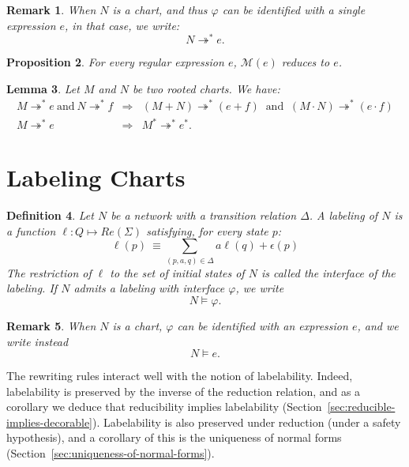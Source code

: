 \documentclass{article}
\newtheorem{definition}{Definition}[section]
\newtheorem{lemma}[definition]{Lemma}
\newtheorem{proposition}[definition]{Proposition}
\newtheorem{remark}[definition]{Remark}
\newcommand{\milner}[1]{\mathcal{M}(#1)}
\begin{document}
\begin{remark}
  When $N$ is a chart, and thus $\varphi$ can be identified with a single expression $e$, in that case, we write:
  \[N \twoheadrightarrow^* e.\] 
  \end{remark}


\begin{proposition} For every regular expression $e$, $\milner{e}$ reduces to $e$.
    ~\label{prop:Milner-is-reducible}
\end{proposition}


\begin{lemma} Let $M$ and $N$ be two rooted charts. We have:
  $$\begin{array}{rcl}
    M\twoheadrightarrow^* e\ \text{and}\ N\twoheadrightarrow^* f & \Longrightarrow&  (M+N) \twoheadrightarrow^* (e+f)\ \text{ and }\ (M \cdot N) \twoheadrightarrow^* (e \cdot f)\\[6pt]
  M \twoheadrightarrow^* e & \Longrightarrow&  M^* \twoheadrightarrow^* e^*.
  \end{array}$$
\end{lemma}

\section{Labeling Charts}

\begin{definition} Let $N$ be a network with a transition relation  $\Delta$. A \emph{labeling} of $N$ is a function
$\ell:Q \mapsto Re(\Sigma)$ satisfying, for every state $p$:
\[\ell(p) \ \equiv \underset{(p,a, q) \in \Delta}{\sum} a \ell(q) + \epsilon(p)\]
The restriction of $\ell$ to the set of initial states of $N$ is called the \emph{interface} of the labeling. If $N$ admits a labeling with interface $\varphi$, we write \[N\models \varphi.\]
\end{definition}

\begin{remark}
When $N$ is a chart, $\varphi$ can be identified with an expression $e$, and we write instead
\[N\models e.\]
\end{remark}




The rewriting rules interact well with the notion of labelability. Indeed, labelability is preserved by the inverse of the reduction relation, and as a corollary we deduce that reducibility implies labelability (Section~\ref{sec:reducible-implies-decorable}).  Labelability is also preserved under reduction (under a safety hypothesis), and a corollary of this is the uniqueness of normal forms (Section~\ref{sec:uniqueness-of-normal-forms}).
\end{document}
